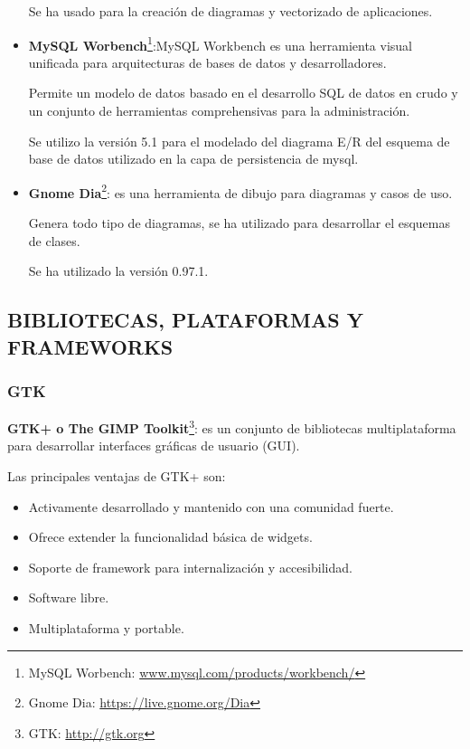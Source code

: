 \begin{itemize}
Se ha usado para la creación de diagramas y vectorizado de
aplicaciones.

\item \textbf{MySQL Worbench}\footnote{MySQL Worbench:
\url{www.mysql.com/products/workbench/}\label{ftn:workbench}}:MySQL
Workbench es una herramienta visual unificada para arquitecturas de bases
de datos y desarrolladores.

Permite un modelo de datos basado en el desarrollo SQL de datos en crudo y
un conjunto de herramientas comprehensivas para la administración.

Se utilizo la versión 5.1 para el modelado del diagrama E/R del esquema de
base de datos utilizado en la capa de persistencia de mysql.

\item \textbf{Gnome Dia}\footnote{Gnome Dia:
\url{https://live.gnome.org/Dia}\label{ftn:gnomedia}}: es una herramienta
de dibujo para diagramas y casos de uso.

Genera todo tipo de diagramas, se ha utilizado para desarrollar el esquemas
de clases.

Se ha utilizado la versión 0.97.1.

\end{itemize}

\subsection{\uppercase{Bibliotecas, plataformas y frameworks}}

\subsubsection{GTK}
\label{sec:GTK}
\textbf{\acs{GTK+}\label{acro:GTK+} o The GIMP Toolkit}\footnote{GTK:
\url{http://gtk.org}\label{ftn:Gtk}}: es un conjunto de bibliotecas
multiplataforma para desarrollar interfaces gráficas de usuario
(\acs{GUI}\label{acro:GUI}).

Las principales ventajas de GTK+ son:

\begin{itemize}
  \item Activamente desarrollado y mantenido con una comunidad fuerte.
  \item Ofrece extender la funcionalidad básica de widgets.
  \item Soporte de framework para internalización y accesibilidad.
  \item Software libre.
  \item Multiplataforma y portable.
\end{itemize}


